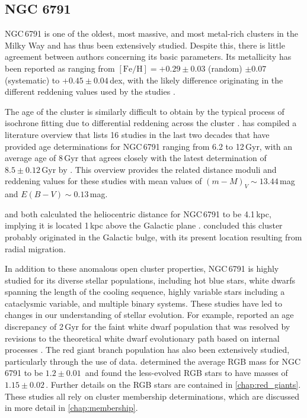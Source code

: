 \subsection{NGC 6791}

NGC\,6791 is one of the oldest, most massive, and most metal-rich clusters in the Milky Way and has thus been extensively studied. Despite this, there is little agreement between authors concerning its basic parameters. Its metallicity has been reported as ranging from $[\mathrm{Fe/H}] = +0.29 \pm 0.03$ (random) $\pm 0.07$ (systematic) to $+0.45 \pm 0.04$\,dex, with the likely difference originating in the different reddening values used by the studies \cite[eg.][and references therein]{villanova_ngc_2018, cunha_sodium_2015}.

The age of the cluster is similarly difficult to obtain by the typical process of isochrone fitting due to differential reddening across the cluster \citep{brogaard_age_2012}. \cite{wu_asteroseismic_2014} has compiled a literature overview that lists 16 studies in the last two decades that have provided age determinations for NGC\,6791 ranging from 6.2 to 12\,Gyr, with an average age of \texttildelow{}8\,Gyr that agrees closely with the latest determination of $8.5 \pm 0.12$\,Gyr by \cite{hoyman_analysis_2019}. This overview provides the related distance moduli and reddening values for these studies with mean values of $(m-M)_V \sim 13.44$\,mag and $E(B-V) \sim 0.13$\,mag. 

\cite{king_color-magnitude_2005} and \cite{basu_sounding_2011} both calculated the heliocentric distance for NGC\,6791 to be \texttildelow{}4.1\,kpc, implying it is located \texttildelow{}1\,kpc above the Galactic plane \cite[see also ][]{cantat-gaudin_gaia_2018,grundahl_new_2008}. \cite{villanova_ngc_2018} concluded this cluster probably originated in the Galactic bulge, with its present location resulting from radial migration. 

In addition to these anomalous open cluster properties, NGC\,6791 is highly studied for its diverse stellar populations, including hot blue stars, white dwarfs spanning the length of the cooling sequence, highly variable stars including a cataclysmic variable, and multiple binary systems. These studies have led to changes in our understanding of stellar evolution. For example, \cite{bedin_reaching_2008} reported an age discrepancy of 2\,Gyr for the faint white dwarf population that was resolved by revisions to the theoretical white dwarf evolutionary path based on internal processes \citep{garcia-berro_white_2010}. The red giant branch population has also been extensively studied, particularly through the use of \Kepler{} data. \cite{basu_sounding_2011} determined the average RGB mass for NGC\,6791 to be $1.2 \pm 0.01$\,\Msol{} and \cite{brogaard_age_2012} found the less-evolved RGB stars to have masses of $1.15 \pm 0.02$\,\Msol{}. Further details on the RGB stars are contained in \cref{chap:red_giants}. These studies all rely on cluster membership determinations, which are discussed in more detail in \cref{chap:membership}.

